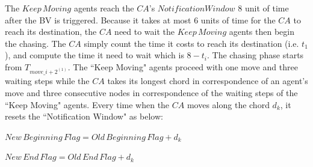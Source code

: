 The $Keep\,Moving$ agents reach the $CA$'s $Notification Window$ 8 unit of time after the BV is triggered. Because it takes at most 6 units of time for the $CA$ to reach its destination, the $CA$ need to wait the $Keep\,Moving$ agents then begin the chasing. The $CA$ simply count the time it costs to reach its destination (i.e. $t_1$), and compute the time it need to wait which is $8-t_i$.
The chasing phase starts from $T_{move\_{{i+2}^{(1)}}}$. The ``Keep Moving" agents proceed with one move and three waiting steps while the $CA$ takes its longest chord in correspondence of an agent's move and three consecutive nodes in correspondence of the waiting steps of the ``Keep Moving" agents. Every time when the $CA$ moves along the chord $d_k$, it resets the ``Notification Window" as below: 

$New\,Beginning\,Flag=Old\,Beginning\,Flag+d_k$

$New\,End\,Flag=Old\,End\,Flag+d_k$

